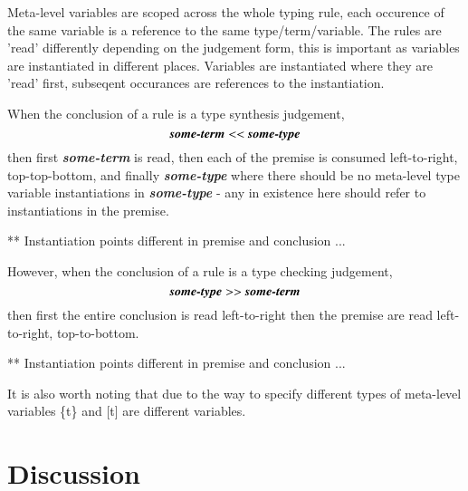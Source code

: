 Meta-level variables are scoped across the whole typing rule, each
occurence of the same variable is a reference to the same
type/term/variable. The rules are 'read' differently depending on the
judgement form, this is important as variables are instantiated in
different places. Variables are instantiated where they are 'read'
first, subseqent occurances are references to the instantiation.

When the conclusion of a rule is a type synthesis judgement,
$$\textbf{\emph{some-term}} << \textbf{\emph{some-type}}$$ then first
\textbf{\emph{some-term}} is read, then each of the premise is consumed
left-to-right, top-top-bottom, and finally \textbf{\emph{some-type}}
where there should be no meta-level type variable instantiations in
\textbf{\emph{some-type}} - any in existence here should refer to
instantiations in the premise.

** Instantiation points different in premise and conclusion ...

However, when the conclusion of a rule is a type checking judgement,
$$\textbf{\emph{some-type}} >> \textbf{\emph{some-term}}$$ then first
the entire conclusion is read left-to-right then the premise are read
left-to-right, top-to-bottom.

** Instantiation points different in premise and conclusion ...

It is also worth noting that due to the way to specify different types
of meta-level variables \{t\} and [t] are different variables.

\section{Discussion}


